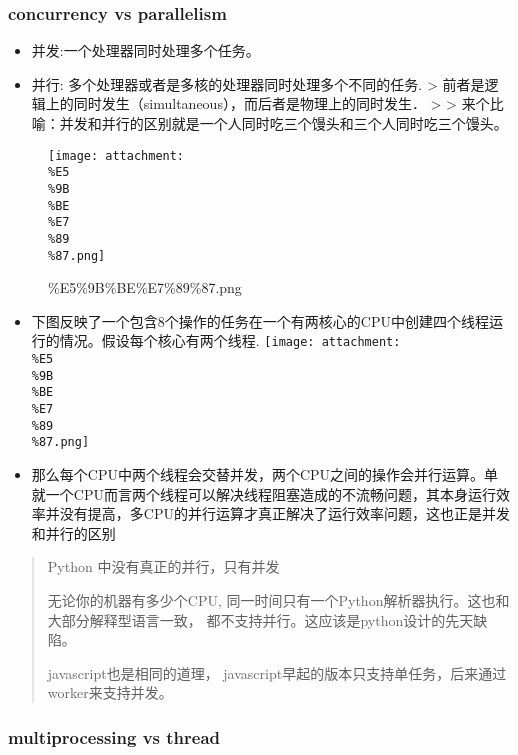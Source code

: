 \documentclass[11pt]{article}
\makeatletter
\def\maxwidth{\ifdim\Gin@nat@width>\linewidth\linewidth
    \else\Gin@nat@width\fi}
\let\Oldincludegraphics\includegraphics
\renewcommand{\includegraphics}[1]{\Oldincludegraphics[width=.8\maxwidth]{#1}}
\providecommand{\tightlist}{%
      \setlength{\itemsep}{0pt}\setlength{\parskip}{0pt}}
\makeatother
\begin{document}
    \hypertarget{concurrency-vs-parallelism}{%
\subsubsection{concurrency vs
parallelism}\label{concurrency-vs-parallelism}}

\begin{itemize}
\tightlist
\item
  并发:一个处理器同时处理多个任务。
\item
  并行: 多个处理器或者是多核的处理器同时处理多个不同的任务.
  \textgreater{}
  前者是逻辑上的同时发生（simultaneous），而后者是物理上的同时发生．
  \textgreater{} \textgreater{}
  来个比喻：并发和并行的区别就是一个人同时吃三个馒头和三个人同时吃三个馒头。
\end{itemize}

    \begin{figure}
\centering
\texttt{[image: attachment:\\\%E5\\\%9B\\\%BE\\\%E7\\\%89\\\%87.png]}
\caption{\%E5\%9B\%BE\%E7\%89\%87.png}
\end{figure}

    \begin{itemize}
\tightlist
\item
  下图反映了一个包含8个操作的任务在一个有两核心的CPU中创建四个线程运行的情况。假设每个核心有两个线程.
  \texttt{[image: attachment:\\\%E5\\\%9B\\\%BE\\\%E7\\\%89\\\%87.png]}
\end{itemize}

    \begin{itemize}
\tightlist
\item
  那么每个CPU中两个线程会交替并发，两个CPU之间的操作会并行运算。单就一个CPU而言两个线程可以解决线程阻塞造成的不流畅问题，其本身运行效率并没有提高，多CPU的并行运算才真正解决了运行效率问题，这也正是并发和并行的区别
\end{itemize}

    \begin{quote}
Python 中没有真正的并行，只有并发

无论你的机器有多少个CPU,
同一时间只有一个Python解析器执行。这也和大部分解释型语言一致，
都不支持并行。这应该是python设计的先天缺陷。

javascript也是相同的道理，
javascript早起的版本只支持单任务，后来通过worker来支持并发。
\end{quote}

    \hypertarget{multiprocessing-vs-thread}{%
\subsubsection{multiprocessing vs
thread}\label{multiprocessing-vs-thread}}
\end{document}
